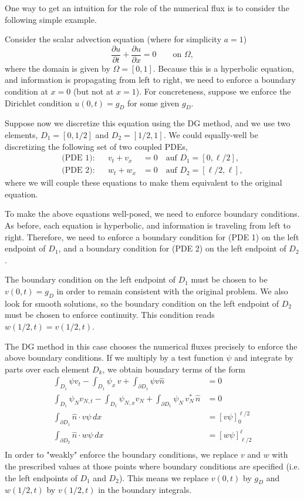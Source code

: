 One way to get an intuition for the role of the numerical flux is to consider the following simple example.

Consider the scalar advection equation (where for simplicity $a=1$)
$$
\frac{\partial u}{\partial t} + \frac{\partial u}{\partial x} = 0 \qquad\text{on $\Omega$},
$$
where the domain is given by $\Omega = [0,1]$. Because this is a hyperbolic equation, and information is propagating from left to right, we need to enforce a boundary condition at $x = 0$ (but not at $x = 1$). For concreteness, suppose we enforce the Dirichlet condition $u(0,t) = g_D$ for some given $g_D$.

Suppose now we discretize this equation using the DG method, and we use two elements, $D_1 = [0,1/2]$ and $D_2 = [1/2,1]$. We could equally-well be discretizing the following set of two coupled PDEs,
\begin{align*}
\text{(PDE 1):} && v_t + v_x &= 0 \quad\text{auf $D_1=[0,\ell/2]$},\\
\text{(PDE 2):} && w_t + w_x &= 0 \quad\text{auf $D_2=[\ell/2,\ell]$},
\end{align*}
where we will couple these equations to make them equivalent to the original equation.

To make the above equations well-posed, we need to enforce boundary conditions. As before, each equation is hyperbolic, and information is traveling from left to right. Therefore, we need to enforce a boundary condition for (PDE 1) on the left endpoint of $D_1$, and a boundary condition for (PDE 2) on the left endpoint of $D_2$.

The boundary condition on the left endpoint of $D_1$ must be chosen to be $v(0,t) = g_D$ in order to remain consistent with the original problem. We also look for smooth solutions, so the boundary condition on the left endpoint of $D_2$ must be chosen to enforce continuity. This condition reads $w(1/2,t) = v(1/2,t)$.

The DG method in this case chooses the numerical fluxes precisely to enforce the above boundary conditions. If we multiply by a test function $\psi$ and integrate by parts over each element $D_k$, we obtain boundary terms of the form
\begin{align*}
  \int_{D_1} \psi v_t - \int_{D_1} \psi_x \, v + \int_{\partial D_1} \psi  v \hat{n}  &= 0\\
  \int_{D_1} \psi_N v_{N,t} - \int_{D_1} \psi_{N,x}  v_N + \int_{\partial D_1} \psi_N  \,v_N^* \, \hat{n}  &= 0 \\
\int_{\partial D_1} \hat{n} \cdot v \psi \, dx &= \left[ v\psi \right]_0^{\ell/2}\\
\int_{\partial D_2} \hat{n} \cdot w \psi \, dx &= \left[ w\psi\right]_{\ell/2}^\ell \\
\end{align*}
In order to "weakly" enforce the boundary conditions, we replace $v$ and $w$ with the prescribed values at those points where boundary conditions are specified (i.e. the left endpoints of $D_1$ and $D_2$). This means we replace $v(0,t)$ by $g_D$ and $w(1/2,t)$ by $v(1/2,t)$ in the boundary integrals.

